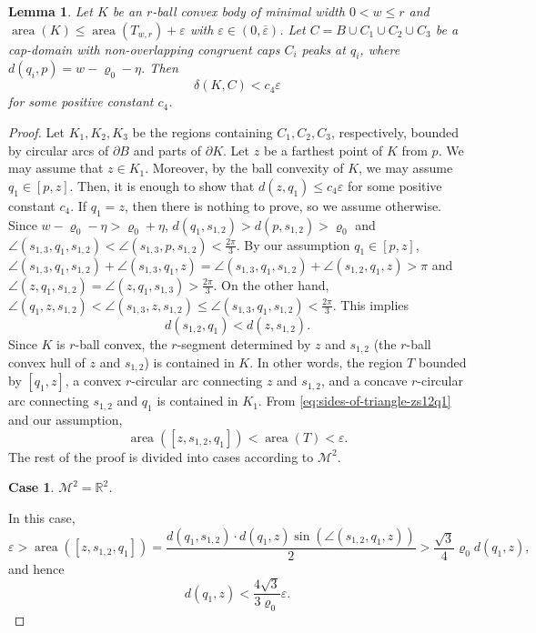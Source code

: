 \documentclass[10pt,a4paper]{amsart}
\newtheorem{lemma}{Lemma}
\newtheorem{case}{Case}
\newcommand{\M}{\mathcal{M}}
\newcommand{\R}{{\mathbb R}}
\DeclareMathOperator{\area}{\mathrm{area}}
\begin{document}
\begin{lemma}\label{lem:distance-of-K-and-C}
Let $K$ be an $r$-ball convex body of minimal width $0<w\leq r$ and $\area(K)\leq\area(T_{w,r})+\varepsilon$ with $\varepsilon\in(0,\overline{\varepsilon})$. Let $C=B\cup C_1\cup C_2\cup C_3$ be a cap-domain with non-overlapping congruent caps $C_i$ peaks at $q_i$, where $d(q_i,p)=w-\varrho_0-\eta$. Then
$$
\delta(K,C)<c_4\varepsilon
$$
for some positive constant $c_4$.
\end{lemma}

\begin{proof}
Let $K_1,K_2,K_3$ be the regions containing $C_1,C_2,C_3$, respectively, bounded by circular arcs of $\partial B$ and parts of $\partial K$. Let $z$ be a farthest point of $K$ from $p$. We may assume that $z\in K_1$. Moreover, by the ball convexity of $K$, we may assume $q_1\in[p,z]$. Then, it is enough to show that $d(z,q_1)\leq c_4\varepsilon$ for some positive constant $c_4$. If $q_1=z$, then there is nothing to prove, so we assume otherwise. Since $w-\varrho_0-\eta>\varrho_0+\eta$, $d(q_1,s_{1,2})>d(p,s_{1,2})>\varrho_0$ and $\angle(s_{1,3},q_1,s_{1,2})<\angle(s_{1,3},p,s_{1,2})<\frac{2\pi}{3}$. By our assumption $q_1\in[p,z]$, $\angle(s_{1,3},q_1,s_{1,2})+\angle(s_{1,3},q_1,z)=\angle(s_{1,3},q_1,s_{1,2})+\angle(s_{1,2},q_1,z)>\pi$ and $\angle(z,q_1,s_{1,2})=\angle(z,q_1,s_{1,3})>\frac{2\pi}{3}$. On the other hand, $\angle(q_1,z,s_{1,2})<\angle(s_{1,3},z,s_{1,2})\leq\angle(s_{1,3},q_1,s_{1,2})<\frac{2\pi}{3}$. This implies
\begin{equation}\label{eq:sides-of-triangle-zs12q1}
d(s_{1,2},q_1)<d(z,s_{1,2}).
\end{equation}
Since $K$ is $r$-ball convex, the $r$-segment determined by $z$ and $s_{1,2}$ (the $r$-ball convex hull of $z$ and $s_{1,2}$) is contained in $K$. In other words, the region $T$ bounded by $[q_1,z]$, a convex $r$-circular arc connecting $z$ and $s_{1,2}$, and a concave $r$-circular arc connecting $s_{1,2}$ and $q_1$ is contained in $K_1$. From \eqref{eq:sides-of-triangle-zs12q1} and our assumption,
\begin{equation}
\area([z,s_{1,2},q_1])<\area(T)<\varepsilon.
\end{equation}
The rest of the proof is divided into cases according to $\M^2$.

\setcounter{case}{0}
\begin{case}
    $\M^2=\R^2$.
\end{case}

In this case,
\[
\varepsilon>\area([z,s_{1,2},q_1])=\frac{d(q_1,s_{1,2})\cdot d(q_1,z)\sin(\angle(s_{1,2},q_1,z))}{2}>\frac{\sqrt{3}}{4}\varrho_0 d(q_1,z),
\]
and hence
\[
d(q_1,z)<\frac{4\sqrt{3}}{3\varrho_0}\varepsilon.
\]


\end{proof}
\end{document}
